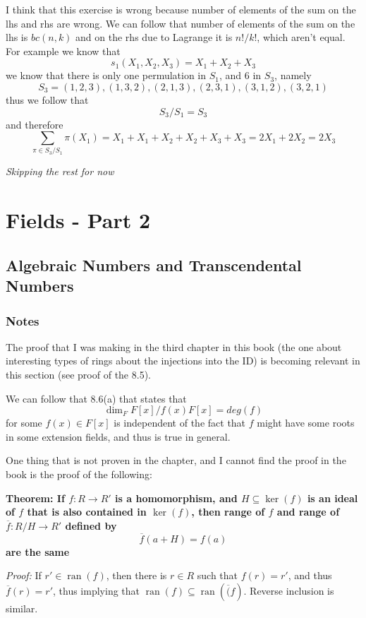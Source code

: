 \documentclass[11pt,oneside,titlepage]{book}
\DeclareMathOperator \ran {ran}
\begin{document}
I think that this exercise is wrong because number of elements of the
sum on the lhs and rhs are wrong. We can follow that number of
elements of the sum on the lhs is $bc(n, k)$ and on the rhs due to
Lagrange it is $n! / k!$, which aren't equal.  For example we know
that
$$s_1(X_1, X_2, X_3) = X_1 + X_2 + X_3$$
we know that there is only one permulation in $S_1$, and $6$ in $S_3$, namely
$$S_3 = (1, 2, 3), (1, 3, 2), (2, 1, 3), (2, 3, 1), (3, 1, 2), (3, 2, 1)$$
thus we follow that
$$S_3 / S_1 = S_3$$
and therefore
$$\sum_{\pi \in S_3/S_1}{\pi(X_1)} = X_1 + X_1 + X_2 + X_2 + X_3 + X_3 = 2X_1 + 2X_2 = 2X_3$$

\textit{Skipping the rest for now}

\chapter{Fields - Part 2}

\section{Algebraic Numbers and Transcendental Numbers}

\subsection*{Notes}

The proof that I was making in the third chapter in this book (the one
about interesting types of rings about the injections into the ID)
is becoming relevant in this section (see proof of the 8.5).

We can follow that 8.6(a) that states that
$$\dim_F F[x]/f(x) F[x] = deg (f)$$
for some $f(x) \in F[x]$ is independent of the fact that $f$ might
have some roots in some extension fields, and thus is true in general.

One thing that is not proven in the chapter, and I cannot find the
proof in the book is the proof of the following:

\textbf{Theorem: If $f: R \to R'$ is a homomorphism, and
  $H \subseteq \ker(f)$ is an ideal of $f$ that is also
  contained in $\ker(f)$, then range of $f$ and range of
  $\overline{f}: R/H \to R'$ defined by
  $$\overline{f}(a + H) = f(a)$$
  are the same}

\textit{Proof: } If $r' \in \ran(f)$, then there is $r \in R$ such
that $f(r) = r'$, and thus $\overline{f}(r) = r'$, thus implying that
$\ran(f) \subseteq \ran(\overline(f)$. Reverse inclusion is similar.
\end{document}
